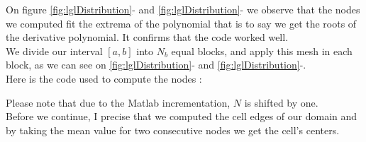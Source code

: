 On figure \ref{fig:lglDistribution}- and \ref{fig:lglDistribution}- we observe that the nodes we computed fit the extrema of the polynomial that is to say we get the roots of the derivative polynomial. It confirms that the code worked well.\\
We divide our interval $[a,b]$ into $N_b$ equal blocks, and apply this mesh in each block, as we can see on \ref{fig:lglDistribution}- and \ref{fig:lglDistribution}-.\\

Here is the code used to compute the nodes : 

Please note that due to the Matlab incrementation, $N$ is shifted by one. \\
Before we continue, I precise that we computed the cell edges of our domain and by taking the mean value for two consecutive nodes we get the cell's centers.